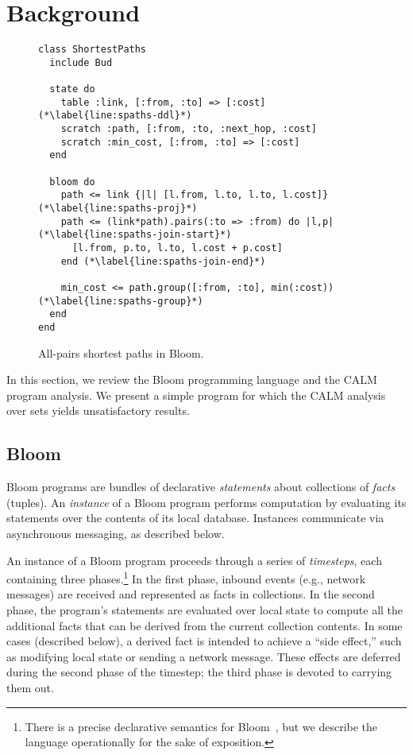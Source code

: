 \section{Background}
\label{sec:background}

\begin{figure}[t]
\begin{scriptsize}
\begin{lstlisting}
class ShortestPaths
  include Bud

  state do
    table :link, [:from, :to] => [:cost] (*\label{line:spaths-ddl}*)
    scratch :path, [:from, :to, :next_hop, :cost]
    scratch :min_cost, [:from, :to] => [:cost]
  end

  bloom do
    path <= link {|l| [l.from, l.to, l.to, l.cost]} (*\label{line:spaths-proj}*)
    path <= (link*path).pairs(:to => :from) do |l,p| (*\label{line:spaths-join-start}*)
      [l.from, p.to, l.to, l.cost + p.cost]
    end (*\label{line:spaths-join-end}*)

    min_cost <= path.group([:from, :to], min(:cost)) (*\label{line:spaths-group}*)
  end
end
\end{lstlisting}
\end{scriptsize}
\caption{All-pairs shortest paths in Bloom.}
\label{fig:bloom-spaths}
\end{figure}

In this section, we review the Bloom programming language and the CALM program
analysis.  We present a simple program for which the CALM analysis over sets
yields unsatisfactory results.

\subsection{Bloom}
\label{sec:bg-bloom}

Bloom programs are bundles of declarative \emph{statements} about collections of
\emph{facts} (tuples). An \emph{instance} of a Bloom program performs
computation by evaluating its statements over the contents of its local
database. Instances communicate via asynchronous messaging, as described below.

An instance of a Bloom program proceeds through a series of \emph{timesteps},
each containing three phases.\footnote{There is a precise declarative semantics
  for Bloom~\cite{dedalus-semantics,dedalus}, but we describe the language
  operationally for the sake of exposition.} In the first phase, inbound events
(e.g., network messages) are received and represented as facts in
collections. In the second phase, the program's statements are evaluated over
local state to compute all the additional facts that can be derived from the
current collection contents. In some cases (described below), a derived fact is
intended to achieve a ``side effect,'' such as modifying local state or sending
a network message.  These effects are deferred during the second phase of the
timestep; the third phase is devoted to carrying them out.

